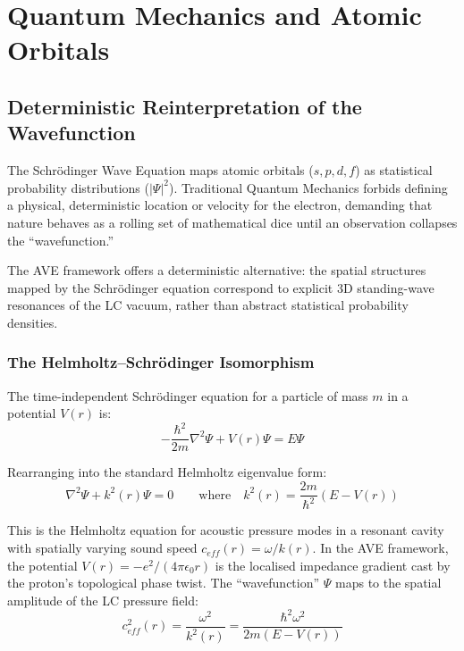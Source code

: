 \chapter{Quantum Mechanics and Atomic Orbitals}
\label{ch:quantum_orbitals}

\section{Deterministic Reinterpretation of the Wavefunction}
The Schrödinger Wave Equation maps atomic orbitals ($s, p, d, f$) as statistical probability distributions ($|\Psi|^2$). Traditional Quantum Mechanics forbids defining a physical, deterministic location or velocity for the electron, demanding that nature behaves as a rolling set of mathematical dice until an observation collapses the ``wavefunction.''

The AVE framework offers a deterministic alternative: the spatial structures mapped by the Schr\"odinger equation correspond to explicit 3D standing-wave resonances of the LC vacuum, rather than abstract statistical probability densities.

\subsection{The Helmholtz--Schrödinger Isomorphism}
The time-independent Schrödinger equation for a particle of mass $m$ in a potential $V(r)$ is:
\begin{equation}
    -\frac{\hbar^2}{2m}\nabla^2 \Psi + V(r)\Psi = E\Psi
\end{equation}

Rearranging into the standard Helmholtz eigenvalue form:
\begin{equation}
    \nabla^2 \Psi + k^2(r)\Psi = 0 \qquad \text{where} \quad k^2(r) = \frac{2m}{\hbar^2}(E - V(r))
\end{equation}

This is the Helmholtz equation for acoustic pressure modes in a resonant cavity with spatially varying sound speed $c_{eff}(r) = \omega / k(r)$. In the AVE framework, the potential $V(r) = -e^2/(4\pi\epsilon_0 r)$ is the localised impedance gradient cast by the proton's topological phase twist. The ``wavefunction'' $\Psi$ maps to the spatial amplitude of the LC pressure field:
\begin{equation}
    c_{eff}^2(r) = \frac{\omega^2}{k^2(r)} = \frac{\hbar^2 \omega^2}{2m(E - V(r))}
\end{equation}


